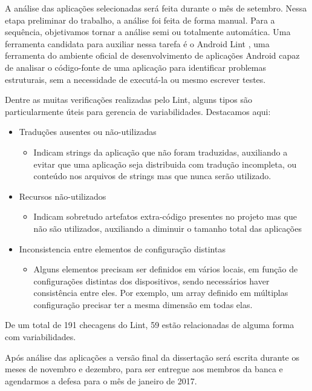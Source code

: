 A análise das aplicações selecionadas será feita durante o mês de setembro. Nessa
etapa preliminar do trabalho, a análise foi feita de forma manual. Para a sequência,
objetivamos  tornar a análise semi ou totalmente automática. Uma ferramenta candidata
para auxiliar nessa tarefa é o Android Lint \cite{Lint}, uma ferramenta do ambiente oficial
de desenvolvimento de aplicações Android capaz de analisar o código-fonte de uma
aplicação para identificar problemas estruturais, sem a necessidade de executá-la
ou mesmo escrever testes.

Dentre as muitas verificações realizadas pelo Lint, alguns tipos são particularmente
úteis para gerencia de variabilidades. Destacamos aqui:
\begin{itemize}
    \item Traduções ausentes ou não-utilizadas
        \begin{itemize}
            \item Indicam strings da aplicação que não foram traduzidas, auxiliando
                a evitar que uma aplicação seja distribuida com tradução incompleta,
                ou conteúdo nos arquivos de strings mas que nunca serão utilizado.
        \end{itemize}
    \item Recursos não-utilizados
        \begin{itemize}
            \item Indicam sobretudo artefatos extra-código presentes no projeto
                mas que não são utilizados, auxiliando a diminuir o tamanho total das aplicações 
        \end{itemize}
    \item Inconsistencia entre elementos de configuração distintas
        \begin{itemize}
            \item Alguns elementos precisam ser definidos em vários locais, em função
                de configurações distintas dos dispositivos, sendo necessários haver
                consistência entre eles. Por exemplo, um array definido em múltiplas
                configuração precisar ter  a mesma dimensão em todas elas.
        \end{itemize}
\end{itemize}

De um total de 191 checagens do Lint, 59 estão relacionadas de alguma forma com
variabilidades.

Após análise das aplicações a versão final da dissertação será escrita durante os
meses de novembro e dezembro, para ser entregue aos membros da banca e agendarmos
a defesa para o mês de janeiro de 2017.

